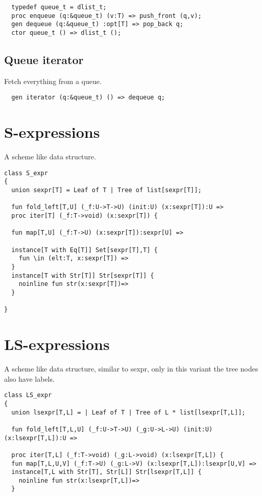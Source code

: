 \documentclass[oneside]{book}
\begin{document}
{\begin{verbatim}
  typedef queue_t = dlist_t;
  proc enqueue (q:&queue_t) (v:T) => push_front (q,v);
  gen dequeue (q:&queue_t) :opt[T] => pop_back q;
  ctor queue_t () => dlist_t ();
\end{verbatim}

\subsection{Queue iterator}
Fetch everything from a queue.

\begin{verbatim}
  gen iterator (q:&queue_t) () => dequeue q;
\end{verbatim}


\section{S-expressions}
A scheme like data structure.

\begin{verbatim}
class S_expr 
{
  union sexpr[T] = Leaf of T | Tree of list[sexpr[T]]; 

  fun fold_left[T,U] (_f:U->T->U) (init:U) (x:sexpr[T]):U =>
  proc iter[T] (_f:T->void) (x:sexpr[T]) {

  fun map[T,U] (_f:T->U) (x:sexpr[T]):sexpr[U] =>

  instance[T with Eq[T]] Set[sexpr[T],T] {
    fun \in (elt:T, x:sexpr[T]) => 
  }
  instance[T with Str[T]] Str[sexpr[T]] {
    noinline fun str(x:sexpr[T])=>
  }

}

\end{verbatim}

\section{LS-expressions}
A scheme like data structure, similar to sexpr, only in this variant
the tree nodes also have labels.

\begin{verbatim}
class LS_expr 
{
  union lsexpr[T,L] = | Leaf of T | Tree of L * list[lsexpr[T,L]]; 

  fun fold_left[T,L,U] (_f:U->T->U) (_g:U->L->U) (init:U) (x:lsexpr[T,L]):U =>

  proc iter[T,L] (_f:T->void) (_g:L->void) (x:lsexpr[T,L]) {
  fun map[T,L,U,V] (_f:T->U) (_g:L->V) (x:lsexpr[T,L]):lsexpr[U,V] =>
  instance[T,L with Str[T], Str[L]] Str[lsexpr[T,L]] {
    noinline fun str(x:lsexpr[T,L])=>
  }


\end{verbatim}}
\end{document}
